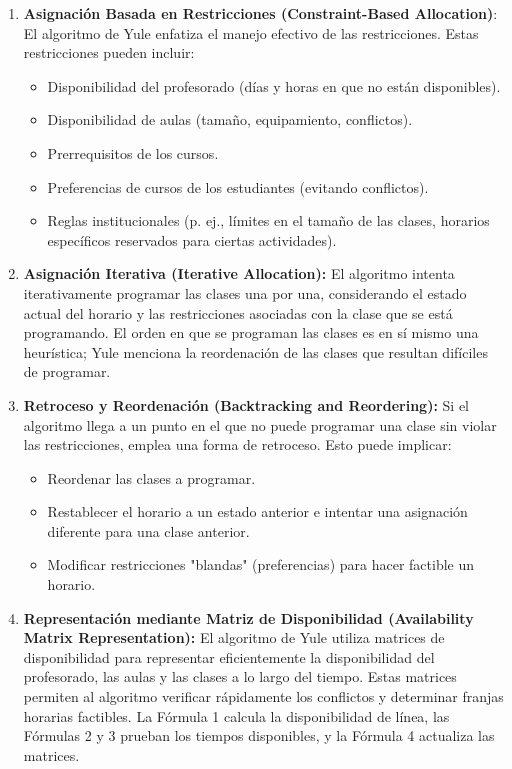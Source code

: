 \begin{enumerate}[label=\alph*.]
    \item \textbf{Asignación Basada en Restricciones (Constraint-Based Allocation)}: El algoritmo de Yule enfatiza el manejo efectivo de las restricciones.
	Estas restricciones pueden incluir:
    \begin{itemize}
        \item Disponibilidad del profesorado (días y horas en que no están disponibles).
        \item Disponibilidad de aulas (tamaño, equipamiento, conflictos).
        \item Prerrequisitos de los cursos.
        \item Preferencias de cursos de los estudiantes (evitando conflictos).
        \item Reglas institucionales (p. ej., límites en el tamaño de las clases, horarios específicos reservados para ciertas actividades).
    \end{itemize}

    \item \textbf{Asignación Iterativa (Iterative Allocation):} El algoritmo intenta iterativamente programar las clases una por una, considerando el estado actual del horario y las restricciones asociadas con la clase que se está programando.
	El orden en que se programan las clases es en sí mismo una heurística; Yule menciona la reordenación de las clases que resultan difíciles de programar.

    \item \textbf{Retroceso y Reordenación (Backtracking and Reordering):} Si el algoritmo llega a un punto en el que no puede programar una clase sin violar las restricciones, emplea una forma de retroceso.
	Esto puede implicar:
    \begin{itemize}
        \item Reordenar las clases a programar.
        \item Restablecer el horario a un estado anterior e intentar una asignación diferente para una clase anterior.
        \item Modificar restricciones "blandas" (preferencias) para hacer factible un horario.
    \end{itemize}

    \item \textbf{Representación mediante Matriz de Disponibilidad (Availability Matrix Representation):} El algoritmo de Yule utiliza matrices de disponibilidad para representar eficientemente la disponibilidad del profesorado, las aulas y las clases a lo largo del tiempo.
	Estas matrices permiten al algoritmo verificar rápidamente los conflictos y determinar franjas horarias factibles.
	La Fórmula 1 calcula la disponibilidad de línea, las Fórmulas 2 y 3 prueban los tiempos disponibles, y la Fórmula 4 actualiza las matrices.


\end{enumerate}
